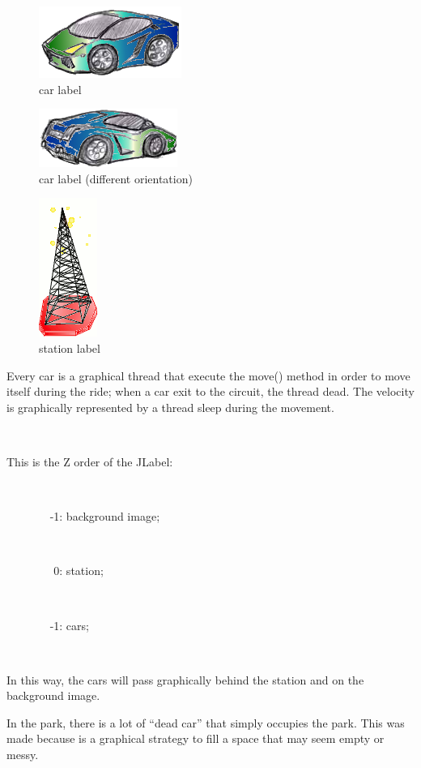\documentclass[a4paper,titlepage]{article}
\begin{document}
\begin{figure}[!ht]
\centering
\includegraphics[scale=0.2]{../car.png}
\caption{car label}
\end{figure}


\begin{figure}[!ht]
\centering
\includegraphics[scale=0.2]{../car2.png}
\caption{car label (different orientation)}
\end{figure}

\begin{figure}[!ht]
\centering
\includegraphics[scale=0.5]{../radio.png}
\caption{station label}
\end{figure}


Every car is a graphical thread that execute the move() method in order to move itself during the ride; when a car exit to the circuit, the thread dead. The velocity is graphically represented by a thread sleep during the movement.

~

This is the Z order of the JLabel:

~

~ ~ ~ ~ ~-1: background image;

~

~ ~ ~ ~ ~ 0: station;

~

~ ~ ~ ~ ~-1: cars;

~

In this way, the cars will pass graphically behind the station and on the background image.


In the park, there is a lot of ``dead car'' that simply occupies the park. This was made because is a graphical strategy to fill a space that may seem empty or messy.
\end{document}
